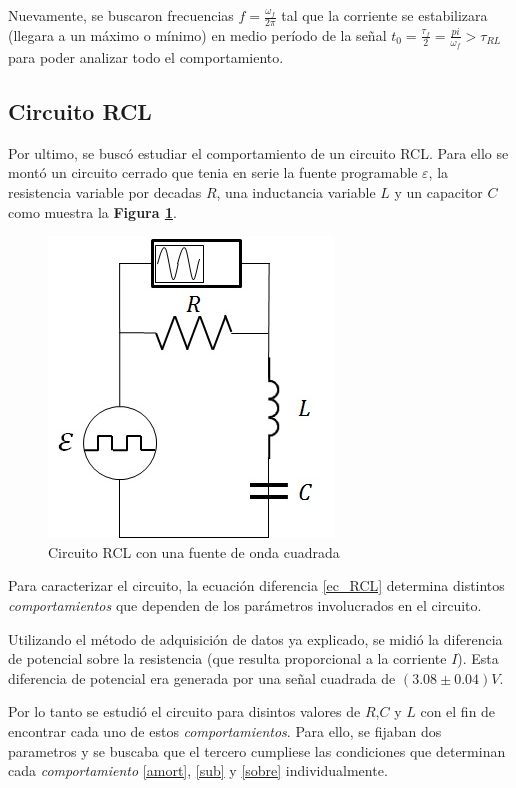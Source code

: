 \documentclass[11pt,a4paper]{article}
\begin{document}
Nuevamente, se buscaron frecuencias $f = \frac{\omega_f}{2\pi}$ tal que la corriente se estabilizara (llegara a un máximo o mínimo) en medio período de la señal $t_0 = \frac{\tau_f}{2} = \frac{pi}{\omega_f} > \tau_{RL}$ para poder analizar todo el comportamiento.

\subsection{Circuito RCL}

Por ultimo, se buscó estudiar el comportamiento de un circuito RCL. Para ello se montó un circuito cerrado que tenia en serie la fuente programable $\varepsilon$, la resistencia variable por decadas $R$, una inductancia variable $L$ y un capacitor $C$ como muestra la \textbf{Figura \ref{fig:RCL}}.  

\begin{figure}[h]
\centering
\includegraphics[scale=0.7]{Circuito-RCL}
  \caption{Circuito RCL con una fuente de onda cuadrada}
  \label{fig:RCL}
\end{figure}

Para caracterizar el circuito, la ecuación diferencia \eqref{ec_RCL} determina distintos \textit{comportamientos} que dependen de los parámetros involucrados en el circuito.

Utilizando el método de adquisición de datos ya explicado, se midió la diferencia de potencial sobre la resistencia (que resulta proporcional a la corriente $I$). Esta diferencia de potencial era generada por una señal cuadrada de $(3.08 \pm 0.04)V$.

Por lo tanto se estudió el circuito para disintos valores de $R$,$C$ y $L$ con el fin de encontrar cada uno de estos \textit{comportamientos}. Para ello, se fijaban dos parametros y se buscaba que el tercero cumpliese las condiciones que determinan cada \textit{comportamiento} \eqref{amort}, \eqref{sub} y \eqref{sobre} individualmente.
\end{document}
